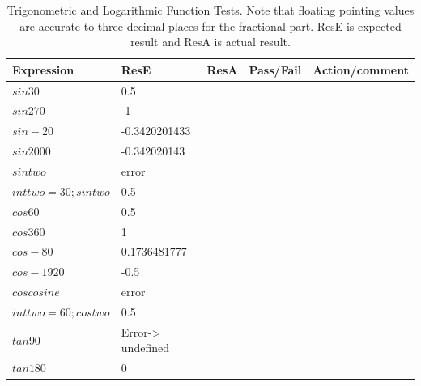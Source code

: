\documentclass[a4paper, oneside, 11pt]{report}
\begin{document}
\begin{table}[h]
\centering
\caption{Trigonometric and Logarithmic Function Tests. Note that floating pointing values are accurate to three decimal places for the fractional part. ResE is expected result and ResA is actual result. \\}
\label{Table3}
\begin{tabular}{|l|l|l|l|l|} 
\hline
Expression                  & ResE                            & ResA & Pass/Fail & Action/comment  \\ 
\hline \hline
$sin 30$                    & 0.5                             &      &           &                 \\ 
\hline
$sin 270$                   & -1                              &      &           &                 \\ 
\hline
$sin -20$                   & -0.3420201433                   &      &           &                 \\ 
\hline
$sin 2000$                  & -0.342020143                    &      &           &                 \\ 
\hline
$sin two$                 & error                           &      &           &                 \\ 
\hline
$int two = 30; sin two$   & 0.5                             &      &           &                 \\ 
\hline
$cos 60$                  & 0.5                             &      &           &                 \\ 
\hline
$cos 360$                 & 1                               &      &           &                 \\ 
\hline
$cos -80$                 & 0.1736481777                    &      &           &                 \\ 
\hline
$cos -1920$               & -0.5                            &      &           &                 \\ 
\hline
$cos cosine$              & error                           &      &           &                 \\ 
\hline
$int two = 60; cos two$   & 0.5                             &      &           &                 \\ 
\hline
$tan 90$                  & Error-\textgreater{} undefined  &      &           &                 \\ 
\hline
$tan 180$                 & 0                               &      &           &                 \\ 

\end{tabular}
\end{table}
\end{document}
